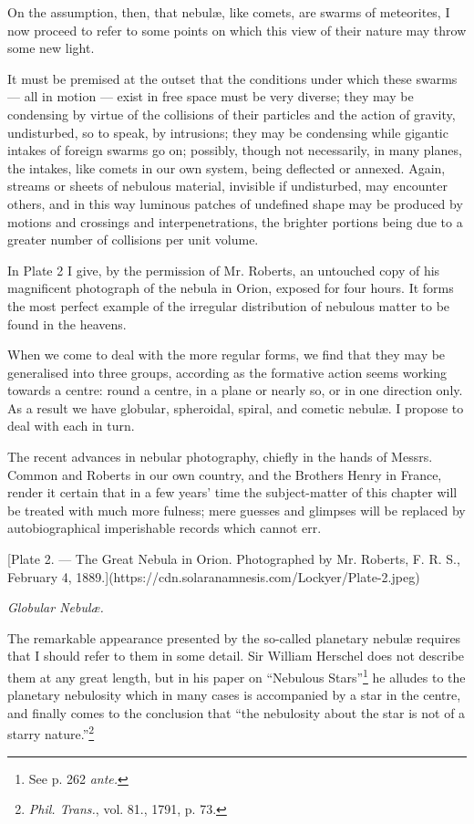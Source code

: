\documentclass[a4paper, 12pt, oneside, polutonikogreek, english]{article}
\begin{document}
On the assumption, then, that nebulæ, like comets, are swarms of meteorites, I now proceed to refer to some points on which this view of their nature may throw some new light.

It must be premised at the outset that the conditions under which these swarms --- all in motion --- exist in free space must be very diverse; they may be condensing by virtue of the collisions of their particles and the action of gravity, undisturbed, so to speak, by intrusions; they may be condensing while gigantic intakes of foreign swarms go on; possibly, though not necessarily, in many planes, the intakes, like comets in our own system, being deflected or annexed. Again, streams or sheets of nebulous material, invisible if undisturbed, may encounter others, and in this way luminous patches of undefined shape may be produced by motions and crossings and interpenetrations, the brighter portions being due to a greater number of collisions per unit volume.

In Plate 2 I give, by the permission of Mr. Roberts, an untouched copy of his magnificent photograph of the nebula in Orion, exposed for four hours. It forms the most perfect example of the irregular distribution of nebulous matter to be found in the heavens.

When we come to deal with the more regular forms, we find that they may be generalised into three groups, according as the formative action seems working towards a centre: round a centre, in a plane or nearly so, or in one direction only. As a result we have globular, spheroidal, spiral, and cometic nebulæ. I propose to deal with each in turn.

The recent advances in nebular photography, chiefly in the hands of Messrs. Common and Roberts in our own country, and the Brothers Henry in France, render it certain that in a few years' time the subject-matter of this chapter will be treated with much more fulness; mere guesses and glimpses will be replaced by autobiographical imperishable records which cannot err.

[Plate 2. --- The Great Nebula in Orion. Photographed by Mr. Roberts, F. R. S., February 4, 1889.](https://cdn.solaranamnesis.com/Lockyer/Plate-2.jpeg)

\emph{Globular Nebulæ.}

The remarkable appearance presented by the so-called planetary nebulæ requires that I should refer to them in some detail. Sir William Herschel does not describe them at any great length, but in his paper on ``Nebulous Stars''\footnote{See p. 262 \emph{ante.}} he alludes to the planetary nebulosity which in many cases is accompanied by a star in the centre, and finally comes to the conclusion that ``the nebulosity about the star is not of a starry nature.''\footnote{\emph{Phil. Trans.}, vol. 81., 1791, p. 73.}
\end{document}
